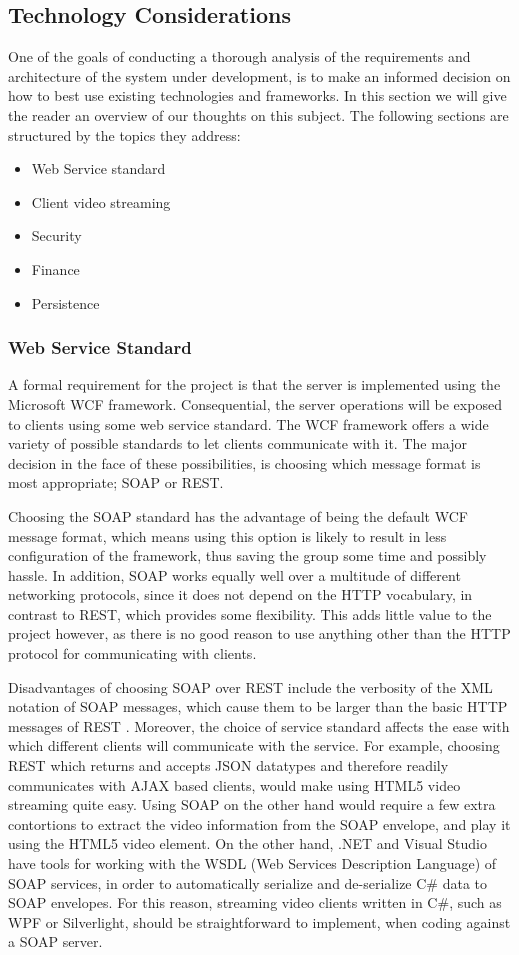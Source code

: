 \subsection{Technology Considerations}
One of the goals of conducting a thorough analysis of the requirements and architecture of the system under development, is to make an informed decision on how to best use existing technologies and frameworks. In this section we will give the reader an overview of our thoughts on this subject. The following sections are structured by the topics they address:
\begin{itemize}
\item Web Service standard
\item Client video streaming
\item Security
\item Finance
\item Persistence
\end{itemize}

\subsubsection{Web Service Standard}
A formal requirement for the project is that the server is implemented using the Microsoft WCF framework. Consequential, the server operations will be exposed to clients using some web service standard. The WCF framework offers a wide variety of possible standards to let clients communicate with it. The major decision in the face of these possibilities, is choosing which message format is most appropriate; SOAP or REST.

Choosing the SOAP standard has the advantage of being the default WCF message format, which means using this option is likely to result in less configuration of the framework, thus saving the group some time and possibly hassle. In addition, SOAP works equally well over a multitude of different networking protocols, since it does not depend on the HTTP vocabulary, in contrast to REST, which provides some flexibility. This adds little value to the project however, as there is no good reason to use anything other than the HTTP protocol for communicating with clients.

Disadvantages of choosing SOAP over REST include the verbosity of the XML notation of SOAP messages, which cause them to be larger than the basic HTTP messages of REST \cite{SOAP}. Moreover, the choice of service standard affects the ease with which different clients will communicate with the service. For example, choosing REST which returns and accepts JSON datatypes and therefore readily communicates with AJAX based clients, would make using  HTML5 video streaming quite easy. Using SOAP on the other hand would require a few extra contortions to extract the video information from the SOAP envelope, and play it using the HTML5 video element. On the other hand, .NET and Visual Studio have tools for working with the WSDL (Web Services Description Language) of SOAP services, in order to automatically serialize and de-serialize C\# data to SOAP envelopes. For this reason, streaming video clients written in C\#, such as WPF or Silverlight, should be straightforward to implement, when coding against a SOAP server.

